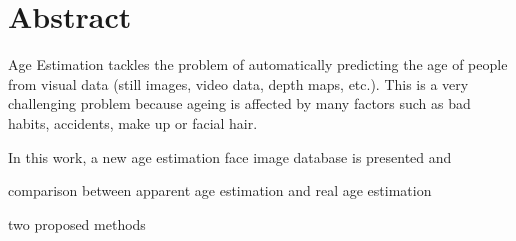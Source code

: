 \chapter*{Abstract}

Age Estimation tackles the problem of automatically predicting the age of people from visual data (still images, video data, depth maps, etc.). 
This is a very challenging problem because ageing is affected by many factors \cite{shephard1997aging} such as bad habits, accidents, make up or facial hair.


In this work, a new age estimation face image database is presented and 

comparison between apparent age estimation and real age estimation

two proposed methods
